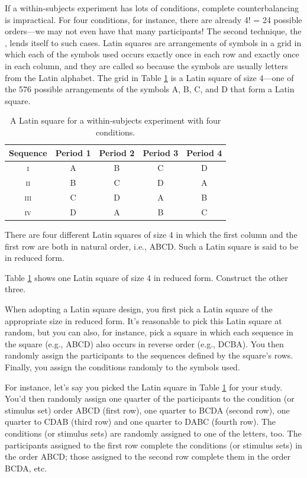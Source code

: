 \medskip

If a within-subjects experiment has lots of conditions,
complete counterbalancing is impractical. For four conditions,
for instance, there are already 4! = 24 possible orders---we may not
even have that many participants! 
The second technique, the , lends itself
to such cases.
Latin squares are arrangements of symbols in a grid in which
each of the symbols used occurs exactly once in each row
and exactly once in each column,
and they are called so because the symbols are usually letters from
the Latin alphabet.
The grid in Table \ref{tab:latquad} is a Latin square
of size 4---one of the 576 possible arrangements of the symbols A, B, C, and D
that form a Latin square.
 
\begin{table}[h]
\centering
\caption{A Latin square for a within-subjects experiment with four conditions.}
\label{tab:latquad}
\begin{tabular}{ccccc}
\toprule
Sequence & Period 1 & Period 2 & Period 3 & Period 4 \\
\midrule
\textsc{i}  & A & B & C & D \\
\textsc{ii} & B & C & D & A \\
\textsc{iii}& C & D & A & B \\
\textsc{iv} & D & A & B & C \\
\bottomrule
\end{tabular}
\end{table}

There are four different Latin squares of size 4 in which the first column
and the first row are both in natural order, i.e., ABCD.
Such a Latin square is said to be in reduced form.

Table \ref{tab:latquad} shows one Latin square of size 4 in reduced form.
Construct the other three.
\parend

When adopting a Latin square design,
you first pick a Latin square of the appropriate size in reduced form.
It's reasonable to pick this Latin square at random,
but you can also, for instance, pick a square 
in which each sequence in the square (e.g., ABCD) also occurs in reverse
order (e.g., DCBA).
You then randomly assign the participants to the sequences defined by
the square's rows.
Finally, you assign the conditions randomly to the symbols used.

For instance, let's say you picked the Latin square in 
Table \ref{tab:latquad} for your study.
You'd then randomly assign one quarter of the participants to
the condition (or stimulus set) order ABCD (first row), 
one quarter to BCDA (second row),
one quarter to CDAB (third row) and one quarter to DABC (fourth row).
The conditions (or stimulus sets) are randomly
assigned to one of the letters, too.
The participants assigned to the first row complete the conditions (or stimulus sets)
in the order ABCD;
those assigned to the second row complete them in the order BCDA, etc.

